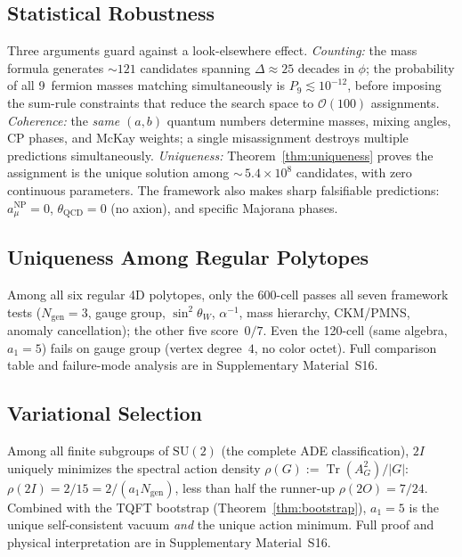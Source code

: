 \documentclass[12pt,a4paper]{article}
\theoremstyle{definition}
\begin{document}
\subsection{Statistical Robustness}
\label{sec:statistics}

Three arguments guard against a look-elsewhere effect.  \emph{Counting:}  the mass formula generates $\sim\!121$ candidates spanning $\Delta \approx 25$ decades in $\phi$; the probability of all 9~fermion masses matching simultaneously is $P_9 \lesssim 10^{-12}$, before imposing the sum-rule constraints that reduce the search space to $\mathcal{O}(100)$ assignments.  \emph{Coherence:}  the \emph{same} $(a,b)$ quantum numbers determine masses, mixing angles, CP phases, and McKay weights; a single misassignment destroys multiple predictions simultaneously.  \emph{Uniqueness:}  Theorem~\ref{thm:uniqueness} proves the assignment is the unique solution among ${\sim}\,5.4 \times 10^8$ candidates, with zero continuous parameters.  The framework also makes sharp falsifiable predictions: $a_\mu^{\text{NP}} = 0$, $\theta_{\text{QCD}} = 0$ (no axion), and specific Majorana phases.

\subsection{Uniqueness Among Regular Polytopes}
\label{sec:uniqueness_polytopes}

Among all six regular 4D polytopes, only the 600-cell passes all seven framework tests ($N_{\text{gen}} = 3$, gauge group, $\sin^2\theta_W$, $\alpha^{-1}$, mass hierarchy, CKM/PMNS, anomaly cancellation); the other five score~$0/7$.  Even the 120-cell (same algebra, $a_1 = 5$) fails on gauge group (vertex degree~$4$, no color octet).  Full comparison table and failure-mode analysis are in Supplementary Material~S16.

\subsection{Variational Selection}
\label{sec:ade_variational}

Among all finite subgroups of $\mathrm{SU}(2)$ (the complete ADE classification), $2I$ uniquely minimizes the spectral action density $\rho(G) := \operatorname{Tr}(A_G^2)/|G|$: $\rho(2I) = 2/15 = 2/(a_1 N_{\text{gen}})$, less than half the runner-up $\rho(2O) = 7/24$.  Combined with the TQFT bootstrap (Theorem~\ref{thm:bootstrap}), $a_1 = 5$ is the unique self-consistent vacuum \emph{and} the unique action minimum.  Full proof and physical interpretation are in Supplementary Material~S16.
\end{document}
